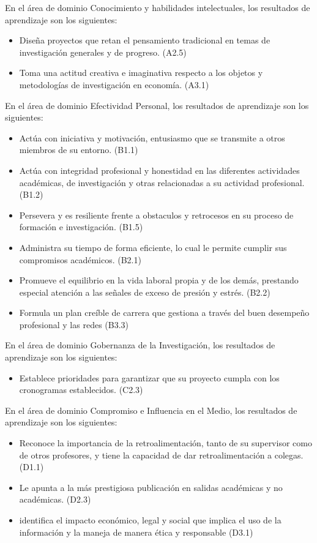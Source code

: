 En el área de dominio Conocimiento y habilidades intelectuales, los resultados de aprendizaje son los siguientes:
\begin{itemize}
\item	Diseña proyectos que retan el pensamiento tradicional en temas de investigación generales y de progreso. (A2.5)
\item	Toma una actitud creativa e imaginativa respecto a los objetos y metodologías de investigación en economía. (A3.1)
\end{itemize}
En el área de dominio Efectividad Personal, los resultados de aprendizaje son los siguientes:
\begin{itemize}
\item	Actúa con iniciativa y motivación, entusiasmo que se transmite a otros miembros de su entorno. (B1.1)
\item	Actúa con integridad profesional y honestidad en las diferentes actividades académicas, de investigación y otras relacionadas a su actividad profesional. (B1.2)
\item	Persevera y es resiliente frente a obstaculos y retrocesos en su proceso de formación e investigación. (B1.5)
\item	Administra su tiempo de forma eficiente, lo cual le permite cumplir sus compromisos académicos. (B2.1)
\item	Promueve el equilibrio en la vida laboral propia y de los demás, prestando especial atención a las señales de exceso de presión y estrés. (B2.2)
\item	Formula un plan creíble de carrera que gestiona a través del buen desempeño profesional y las redes (B3.3)
\end{itemize}
En el área de dominio Gobernanza de la Investigación, los resultados de aprendizaje son los siguientes:
\begin{itemize}
\item	Establece prioridades para garantizar que su proyecto cumpla con los cronogramas establecidos. (C2.3)
\end{itemize}
En el área de dominio Compromiso e Influencia en el Medio, los resultados de aprendizaje son los siguientes:
\begin{itemize}
\item	Reconoce la importancia de la retroalimentación, tanto de su supervisor como de otros profesores, y tiene la capacidad de dar retroalimentación a colegas. (D1.1)
\item	Le apunta a la más prestigiosa publicación en salidas académicas y no académicas. (D2.3)
\item	identifica el impacto económico, legal y social que implica el uso de la información y la maneja de manera ética y responsable (D3.1)
\end{itemize}